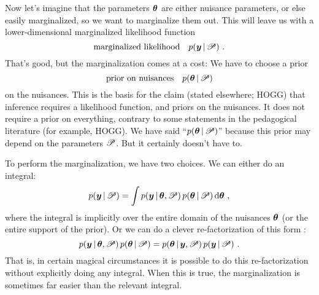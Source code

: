 Now let's imagine that the parameters $\boldsymbol{\theta}$ are either nuisance
parameters, or else easily marginalized, so we want to marginalize
them out.
This will leave us with a lower-dimensional marginalized likelihood
function
\begin{equation}
\mbox{marginalized likelihood} \quad p(\boldsymbol{y}\,|\,\mathscr{P})
~ .
\end{equation}
That's good, but the marginalization comes at a cost:
We have to choose a prior
\begin{equation}
\mbox{prior on nuisances} \quad p(\boldsymbol{\theta}\,|\,\mathscr{P})
\end{equation}
on the nuisances.
This is the basis for the claim (stated elsewhere; HOGG) that
inference requires a likelihood function, and priors on the nuisances.
It does not require a prior on everything, contrary to some statements
in the pedagogical literature (for example, HOGG).
We have said ``$p(\boldsymbol{\theta}\,|\,\mathscr{P})$'' because this prior may depend on
the parameters $\mathscr{P}$. But it certainly doesn't have to.

To perform the marginalization, we have two choices.
We can either do an integral:
\begin{equation}
p(\boldsymbol{y}\,|\,\mathscr{P}) = \int p(\boldsymbol{y}\,|\,\boldsymbol{\theta},\mathscr{P})\,p(\boldsymbol{\theta}\,|\,\mathscr{P})\,\mathrm{d}\boldsymbol{\theta}
~ ,
\end{equation}
where the integral is implicitly over the entire domain of the
nuisances $\boldsymbol{\theta}$ (or the entire support of the prior).
Or we can do a clever re-factorization of this form :
\begin{equation}
p(\boldsymbol{y}\,|\,\boldsymbol{\theta},\mathscr{P})\,p(\boldsymbol{\theta}\,|\,\mathscr{P})
 = p(\boldsymbol{\theta}\,|\,\boldsymbol{y},\mathscr{P})\,p(\boldsymbol{y}\,|\,\mathscr{P})
~ .
\end{equation}
That is, in certain magical circumstances it is possible to do this
re-factorization without explicitly doing any integral.
When this is true, the marginalization is sometimes far easier than
the relevant integral.


